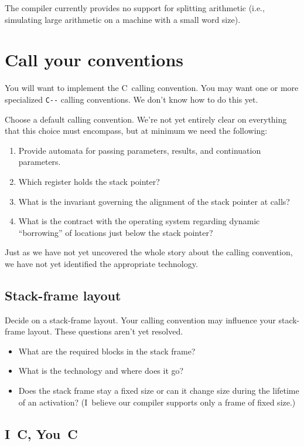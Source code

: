 \documentclass[12pt]{article}
\newcommand\PAL{\texttt{C-{}-}}
\begin{document}
The compiler currently provides no support for splitting arithmetic
(i.e., simulating large arithmetic on a machine with a small word size).

\section{Call your conventions}

You will want to implement the C~calling convention.
You may want one
or more specialized {\PAL} calling conventions.
We don't know how to do this yet.

Choose a default calling convention.
We're not yet entirely clear on everything that this choice must
encompass, but at minimum we need the following:
\begin{enumerate}
\item
Provide automata for passing parameters, results, and continuation parameters.
\item
Which register holds the stack pointer?
\item
What is the invariant governing the alignment of the stack pointer at
calls?
\item
What is the contract with the operating system regarding dynamic
``borrowing'' of locations just below the stack pointer?
\end{enumerate}
Just as we have not yet uncovered the whole story about the calling
convention, we have not yet identified the appropriate technology.


\subsection{Stack-frame layout}

Decide on a stack-frame layout.
Your calling convention may influence your stack-frame layout.
These questions aren't yet resolved.
\begin{itemize}
\item
What are the required blocks in the stack frame?
\item
What is the technology and where does it go?
\item
Does the stack frame stay a fixed size or can it change size during
the lifetime of an activation? 
(I~believe our compiler supports only a frame of fixed size.)
\end{itemize}


\subsection{I~C, You~C}
\end{document}
